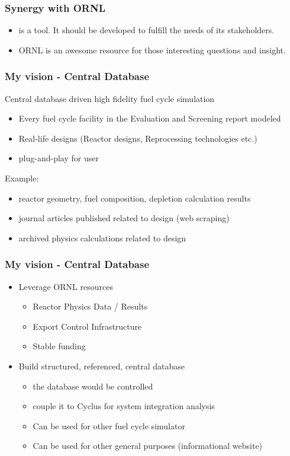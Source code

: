 \begin{frame}
	\frametitle{Synergy with ORNL}
	\begin{itemize}
		\item \Cyclus is a tool. It should be developed to fulfill the needs of its stakeholders.
		\item ORNL is an awesome resource for those interesting questions and insight.
	\end{itemize}
\end{frame}

\begin{frame}
	\frametitle{My vision - Central Database}
	Central database driven high fidelity fuel cycle simulation
    \begin{itemize}
        \item Every fuel cycle facility in the Evaluation and Screening report modeled
        \item Real-life designs (Reactor designs, Reprocessing technologies etc.)
        \item plug-and-play for user
    \end{itemize}
    Example:
    \begin{itemize}
        \item reactor geometry, fuel composition, depletion calculation results
        \item journal articles published related to design (web scraping)
        \item archived physics calculations related to design
    \end{itemize}
\end{frame}


\begin{frame}
	\frametitle{My vision - Central Database}
	\begin{itemize}
		\item Leverage ORNL resources
		\begin{itemize}
			\item Reactor Physics Data / Results
			\item Export Control Infrastructure
			\item Stable funding
		\end{itemize}
		\item Build structured, referenced, central database
		\begin{itemize}
			\item the database would be controlled
			\item couple it to Cyclus for system integration analysis
			\item Can be used for other fuel cycle simulator
			\item Can be used for other general purposes (informational website)
		\end{itemize}
	\end{itemize}
\end{frame}

